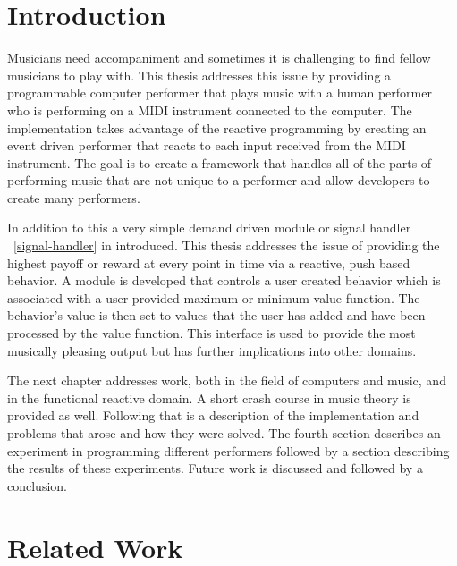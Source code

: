 \documentclass[12pt]{ucthesis}
\begin{document}




\chapter{Introduction}
\label{intro}

Musicians need accompaniment and sometimes it is challenging to find fellow musicians to play with. This thesis addresses this issue by providing a programmable computer performer that plays music with a human performer who is performing on a MIDI instrument connected to the computer. The implementation takes advantage of the reactive programming by creating an event driven performer that reacts to each input received from the MIDI instrument. The goal is to create a framework that handles all of the parts of performing music that are not unique to a performer and allow developers to create many performers. 

In addition to this a very simple demand driven module or signal handler ~\ref{signal-handler} in introduced. This thesis addresses the issue of providing the highest payoff or reward at every point in time via a reactive, push based behavior. A module is developed that controls a user created behavior which is associated with a user provided maximum or minimum value function. The behavior's value is then set to values that the user has added and have been processed by the value function. This interface is used to provide the most musically pleasing output but has further implications into other domains. 

The next chapter addresses work, both in the field of computers and music, and in the functional reactive domain. A short crash course in music theory is provided as well. Following that is a description of the implementation and problems that arose and how they were solved. The fourth section describes an experiment in programming different performers followed by a section describing the results of these experiments. Future work is discussed and followed by a conclusion.

\chapter{Related Work}
\label{rw}
\end{document}
